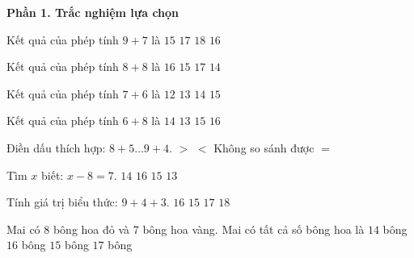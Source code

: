 \textbf{Phần 1. Trắc nghiệm lựa chọn}

\begin{ex} %
Kết quả của phép tính $9 + 7$ là
\choice
{$15$}
{$17$}
{$18$}
{\True $16$}
\end{ex}

\begin{ex} %
Kết quả của phép tính $8 + 8$ là
\choice
{\True $16$}
{$15$}
{$17$}
{$14$}
\end{ex}

\begin{ex} %
Kết quả của phép tính $7 + 6$ là
\choice
{$12$}
{\True $13$}
{$14$}
{$15$}
\end{ex}

\begin{ex} %
Kết quả của phép tính $6 + 8$ là
\choice
{\True $14$}
{$13$}
{$15$}
{$16$}
\end{ex}

\begin{ex} %
Điền dấu thích hợp: $8 + 5 \dots 9 + 4$.
\choice
{$>$}
{$<$}
{Không so sánh được}
{\True $=$}
\end{ex}

\begin{ex} %
Tìm $x$ biết: $x - 8 = 7$.
\choice
{$14$}
{$16$}
{\True $15$}
{$13$}
\end{ex}

\begin{ex} %
Tính giá trị biểu thức: $9 + 4 + 3$.
\choice
{\True $16$}
{$15$}
{$17$}
{$18$}
\end{ex}

\begin{ex} %
Mai có 8 bông hoa đỏ và 7 bông hoa vàng. Mai có tất cả số bông hoa là
\choice
{$14$ bông}
{$16$ bông}
{\True $15$ bông}
{$17$ bông}
\end{ex}

